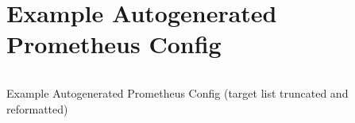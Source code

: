 \section{Example Autogenerated Prometheus Config}
\begin{listing}[H]
  \inputminted{yaml}{./prom.yml}
\caption{Example Autogenerated Prometheus Config (target list truncated and reformatted)}
\end{listing}
